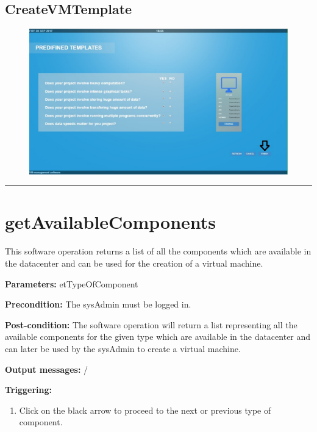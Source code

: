 \subsection{CreateVMTemplate}

\begin{figure}[H]
\centering
\includegraphics[width=170mm]{images/softVMTemplate.eps}
\caption{\label{overflow}}
\end{figure}


\hrule
\vspace{0.5cm}













\section{getAvailableComponents}
\label{operation:getAvailableComponents}
This software operation returns a list of all the components which are available
in the datacenter and can be used for the creation of a virtual machine.
\begin{description}

\item \textbf{Parameters:} etTypeOfComponent
\item \textbf{Precondition:} The sysAdmin must be logged in.
\item \textbf{Post-condition:} The software operation will return a list
representing all the available components for the given type which are available
in the datacenter and can later be used by the sysAdmin to create a virtual machine.

\item \textbf{Output messages:} /

\item \textbf{Triggering:}
\begin{enumerate}
\item Click on the black arrow to proceed to the next or previous type of
component.
\end{enumerate}

 
\end{description}

